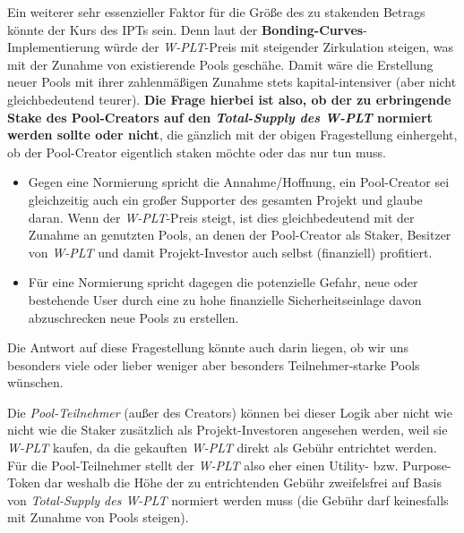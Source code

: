 \vspace{1.0cm}

\begin{Problem}
\vspace{0.2cm}


\vspace{0.5cm}


\vspace{0.5cm}

Ein weiterer sehr essenzieller Faktor für die Größe des zu stakenden Betrags könnte der Kurs des IPTs sein. Denn laut der \textbf{Bonding-Curves}-Implementierung würde der \textit{W-PLT}-Preis mit steigender Zirkulation steigen, was mit der Zunahme von existierende Pools geschähe. Damit wäre die Erstellung neuer Pools mit ihrer zahlen\-mäßigen Zunahme stets kapital-intensiver (aber nicht gleichbedeutend teurer). \textbf{Die Frage hierbei ist also, ob der zu erbringende Stake des Pool-Creators auf den \textit{Total-Supply des W-PLT} normiert werden sollte oder nicht}, die gänzlich mit der obigen Fragestellung einhergeht, ob der Pool-Creator eigentlich staken möchte oder das nur tun muss.
	
\begin{itemize}
	\item Gegen eine Normierung spricht die Annahme/Hoffnung, ein Pool-Creator sei gleichzeitig auch ein großer Supporter des gesamten Projekt und glaube daran. Wenn der \textit{W-PLT}-Preis steigt, ist dies gleichbedeutend mit der Zunahme an genutzten Pools, an denen der Pool-Creator als Staker, Besitzer von \textit{W-PLT} und damit Projekt-Investor auch selbst (finanziell) profitiert.
	\item Für eine Normierung spricht dagegen die potenzielle Gefahr, neue oder bestehende User durch eine zu hohe finanzielle Sicherheitseinlage davon abzuschrecken neue Pools zu erstellen.
\end{itemize}

\vspace{0.2cm}
	
Die Antwort auf diese Fragestellung könnte auch darin liegen, ob wir uns besonders viele oder lieber weniger aber besonders Teilnehmer-starke Pools wünschen.

\vspace{0.5cm}
	
Die \textit{Pool-Teilnehmer} (außer des Creators) können bei dieser Logik aber nicht wie nicht wie die Staker zusätzlich als Projekt-Investoren angesehen werden, weil sie \textit{W-PLT} kaufen, da die gekauften \textit{W-PLT} direkt als Gebühr entrichtet werden. Für die Pool-Teilnehmer stellt der \textit{W-PLT} also eher einen Utility- bzw. Purpose-Token dar weshalb die Höhe der zu entrichtenden Gebühr zweifelsfrei auf Basis von \textit{Total-Supply des W-PLT} normiert werden muss (die Gebühr darf keinesfalls mit Zunahme von Pools steigen).


\end{Problem}


\newpage

